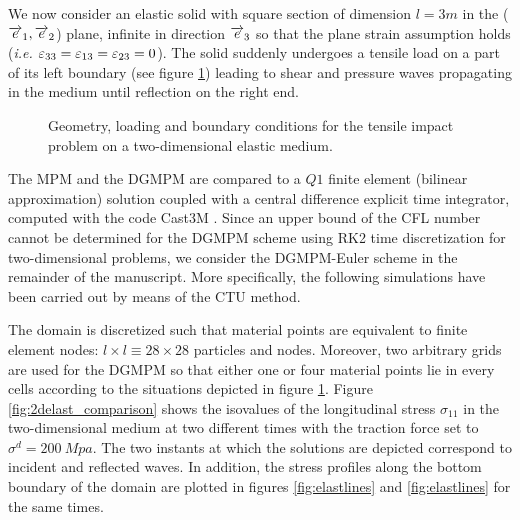 We now consider an elastic solid with square section of dimension $l=3m$ in the (${\overrightarrow{e}}_1,{\overrightarrow{e}}_2$) plane, infinite in direction ${\overrightarrow{e}}_3$ so that the plane strain assumption holds (\textit{i.e. $\varepsilon_{33}=\varepsilon_{13}=\varepsilon_{23}=0$}). The solid suddenly undergoes a tensile load on a part of its left boundary (see figure \ref{fig:2D_planeStrain}) leading to shear and pressure waves propagating in the medium until reflection on the right end.
\begin{figure}[h!]
  \centering
   \qquad
  \caption{Geometry, loading and boundary conditions for the tensile impact problem on a two-dimensional elastic medium.}
  \label{fig:2D_planeStrain}
\end{figure}
The MPM and the DGMPM are compared to a $Q1$ finite element (bilinear approximation) solution coupled with a central difference explicit time integrator, computed with the code Cast3M \cite{Castem}.
Since an upper bound of the CFL number cannot be determined for the DGMPM scheme using RK2 time discretization for two-dimensional problems, we consider the DGMPM-Euler scheme in the remainder of the manuscript.
More specifically, the following simulations have been carried out by means of the CTU method.

The domain is discretized such that material points are equivalent to finite element nodes: $l\times l \equiv 28 \times 28$ particles and nodes. Moreover, two arbitrary grids are used for the DGMPM so that either one or four material points lie in every cells according to the situations depicted in figure \ref{fig:2D_planeStrain}.
Figure \ref{fig:2delast_comparison} shows the isovalues of the longitudinal stress $\sigma_{11}$ in the two-dimensional medium at two different times with the traction force set to $\sigma^d=200\: Mpa$.
The two instants at which the solutions are depicted correspond to incident and reflected waves. In addition, the stress profiles along the bottom boundary of the domain are plotted in figures \ref{fig:elastlines} and \ref{fig:elastlines} for the same times.

